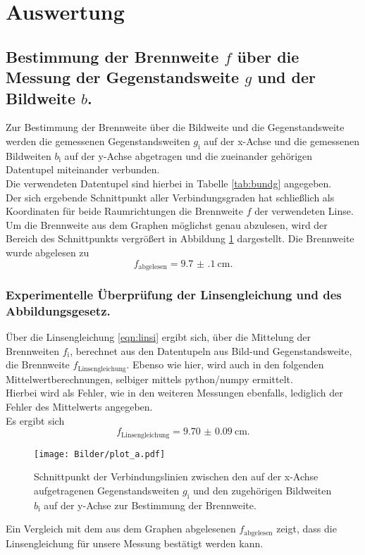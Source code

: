 \section{Auswertung}
\label{sec:Auswertung}
\subsection{Bestimmung der Brennweite $f$ über die Messung der Gegenstandsweite $g$ und der Bildweite $b$.}
Zur Bestimmung der Brennweite über die Bildweite und die Gegenstandsweite werden die gemessenen Gegenstandsweiten $g_{\mathrm{i}}$ auf der x-Achse und die gemessenen Bildweiten $b_{\mathrm{i}}$ auf der y-Achse abgetragen und die zueinander gehörigen Datentupel miteinander verbunden. \\
Die verwendeten Datentupel sind hierbei in Tabelle \ref{tab:bundg} angegeben.
\\Der sich ergebende Schnittpunkt aller Verbindungsgraden hat schließlich als Koordinaten für beide Raumrichtungen die Brennweite $f$ der verwendeten Linse. \\Um die Brennweite aus dem Graphen möglichst genau abzulesen, wird der Bereich des Schnittpunkts vergrößert in Abbildung \ref{fig:plota} dargestellt.
Die Brennweite wurde abgelesen zu
\begin{equation*}
  f_{\mathrm{abgelesen}}=\SI{9.7(1)}{\centi\meter}\text{.}
\end{equation*}
\subsubsection{Experimentelle Überprüfung der Linsengleichung und des Abbildungsgesetz.}
Über die Linsengleichung \eqref{eqn:linsi} ergibt sich, über die Mittelung der Brennweiten $f_{\mathrm{i}}$, berechnet aus den Datentupeln aus Bild-und Gegenstandsweite, die Brennweite $f_{\mathrm{Linsengleichung}}$.
Ebenso wie hier, wird auch in den folgenden Mittelwertberechnungen, selbiger mittels python/numpy \cite{numpy} ermittelt.\\
Hierbei wird als Fehler, wie in den weiteren Messungen ebenfalls, lediglich der Fehler des Mittelwerts angegeben.\\
Es ergibt sich
\begin{equation*}
  f_{\mathrm{Linsengleichung}}=\SI{9.70(9)}{\centi\meter}\text{.}
\end{equation*}

\begin{figure}
  \centering
  \texttt{[image: Bilder/plot\_a.pdf]}
  \caption{Schnittpunkt der Verbindungslinien zwischen den auf der x-Achse aufgetragenen Gegenstandsweiten $g_\mathrm{i}$ und den zugehörigen Bildweiten $b_\mathrm{i}$ auf der y-Achse zur Bestimmung der Brennweite.}
  \label{fig:plota}
\end{figure}
Ein Vergleich mit dem aus dem Graphen abgelesenen $f_{\mathrm{abgelesen}}$ zeigt, dass die Linsengleichung für unsere Messung bestätigt werden kann.


